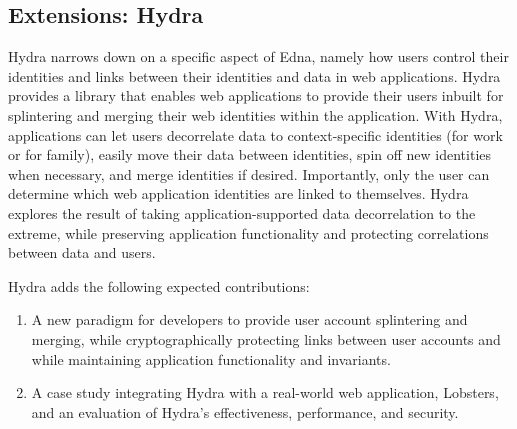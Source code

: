 \subsection{Extensions: Hydra}
Hydra narrows down on a specific aspect of Edna, namely how users control their
identities and links between their identities and data in web applications.
%
Hydra provides a library that enables web applications to provide their
users inbuilt for splintering and merging their web identities within the
application. With Hydra, applications can let users decorrelate data to
context-specific identities (\eg for work or for family), easily
move their data between identities, spin off new identities when necessary, and
merge identities if desired. Importantly, only the user can determine which
web application identities are linked to themselves.
%
Hydra explores the result of taking application-supported data
decorrelation to the extreme, while preserving application functionality and
protecting correlations between data and users. 

Hydra adds the following expected contributions:
\begin{enumerate}[nosep] 
    \item A new paradigm for developers to provide user account splintering and
        merging, while cryptographically protecting links between user accounts
        and while maintaining application functionality and invariants.
    \item A case study integrating Hydra with a real-world web application,
        Lobsters, and an evaluation of Hydra's effectiveness, performance, and
        security.
\end{enumerate}

